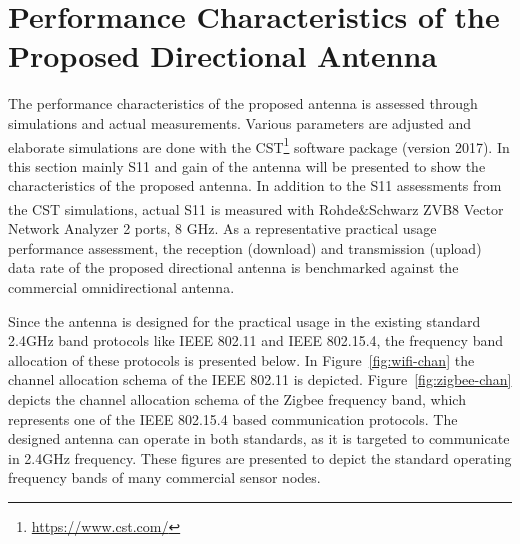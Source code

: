 \documentclass[12pt, oneandhalf, chaparabic, sees, ms]{metu}
\begin{document}
\newpage
\section{Performance Characteristics of the Proposed Directional Antenna}\label{sperfantenna}
\vspace{-0.5cm}
The performance characteristics of the proposed antenna is assessed through simulations and actual measurements.
Various parameters are adjusted and elaborate simulations are done with the CST\footnote{\url{https://www.cst.com/}} software package (version 2017).
In this section mainly S11 and gain of the antenna will be presented to show the characteristics of the proposed antenna.
In addition to the S11 assessments from the CST simulations, actual S11 is measured with Rohde\&Schwarz\textsuperscript{\textregistered} ZVB8 Vector Network Analyzer 2 ports, 8 GHz.
As a representative practical usage performance assessment, the reception (download) and transmission (upload) data rate of the proposed directional antenna is 
benchmarked against the commercial omnidirectional antenna.
% 
%

Since the antenna is designed for the practical usage in the existing standard 2.4GHz band protocols like IEEE 802.11 and IEEE 802.15.4, 
the frequency band allocation of these protocols is presented below.
In Figure~\ref{fig:wifi-chan} the channel allocation schema of the IEEE 802.11 is depicted. 
Figure~\ref{fig:zigbee-chan} depicts the channel allocation schema of the Zigbee frequency band, which represents one of the IEEE 802.15.4 based communication protocols. 
The designed antenna can operate in both standards, as it is targeted to communicate in 2.4GHz frequency. 
These figures are presented to depict the standard operating frequency bands of many commercial sensor nodes.
\end{document}
